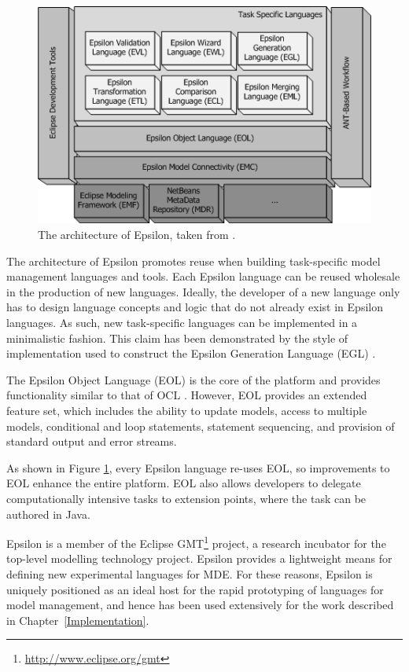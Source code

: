 \begin{figure}[htbp]
  \begin{center}
    \leavevmode
    \includegraphics[scale=0.6]{2.Background/images/epsilon.png}
  \end{center}
  \caption[The architecture of Epsilon]{The architecture of Epsilon, taken from \cite{rose08egl}.}
  \label{fig:epsilon}
\end{figure}

The architecture of Epsilon promotes reuse when building task-specific model management languages and tools. Each Epsilon language can be reused wholesale in the production of new languages. Ideally, the developer of a new language only has to design language concepts and logic that do not already exist in Epsilon languages. As such, new task-specific languages can be implemented in a minimalistic fashion. This \cc claim has been demonstrated by the style of implementation used to construct the Epsilon Generation Language (EGL) \cite{rose08egl}.

The Epsilon Object Language (EOL) \cite{kolovos06eol} is the core of the platform and provides functionality similar to that of OCL \cite{ocl2}. However, EOL provides an extended feature set, which includes the ability to update models, access to multiple models, conditional and loop statements, statement sequencing, and provision of standard output and error streams.

As shown in Figure \ref{fig:epsilon}, every Epsilon language re-uses EOL, so improvements to EOL enhance the entire platform. EOL also allows developers to delegate computationally intensive tasks to extension points, where the task can be authored in Java.

Epsilon is a member of the Eclipse GMT\footnote{\url{http://www.eclipse.org/gmt}} project, a research incubator for the top-level modelling technology project. Epsilon provides a lightweight means for defining new experimental languages for MDE. For these reasons, Epsilon is uniquely positioned as an ideal host for the rapid prototyping of languages for model management, and hence has been used extensively for the work described in Chapter~\ref{Implementation}. 


